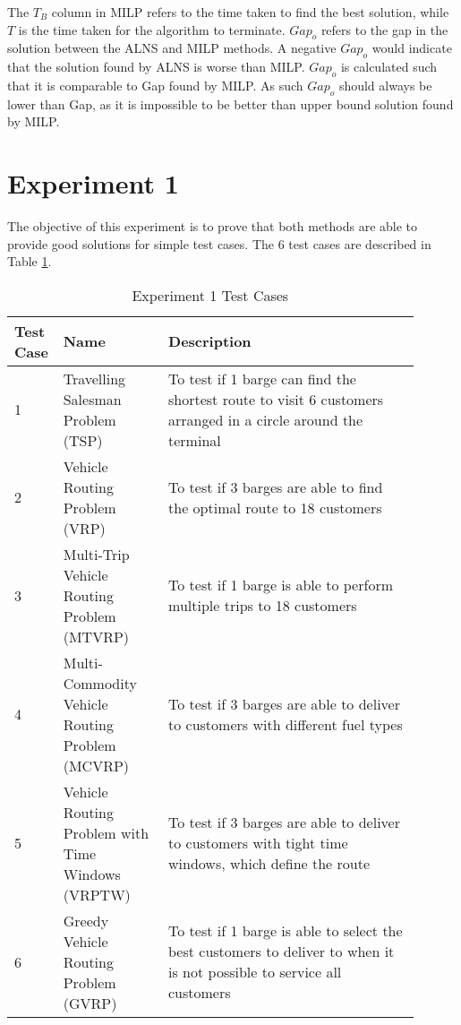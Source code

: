 The $T_{B}$ column in MILP refers to the time taken to find the best solution, while $T$ is the time taken for the algorithm to terminate. $Gap_{o}$ refers to the gap in the solution between the ALNS and MILP methods. A negative $Gap_{o}$ would indicate that the solution found by ALNS is worse than MILP. $Gap_{o}$ is calculated such that it is comparable to Gap found by MILP. As such $Gap_{o}$ should always be lower than Gap, as it is impossible to be better than upper bound solution found by MILP.

\section{Experiment 1}
The objective of this experiment is to prove that both methods are able to provide good solutions for simple test cases. The 6 test cases are described in Table \ref{tab:Expt_1}. 

\begin{table}[h]
    \centering
    \begin{tabular}{p{0.05\linewidth}>{\raggedright}p{0.25\linewidth} p{0.6\linewidth}}
        \toprule
        \textbf{Test Case}&\textbf{Name} & \textbf{Description} \\ 
        \midrule
    
	1& Travelling Salesman Problem (TSP) & To test if 1 barge can find the shortest route to visit 6 customers arranged in a circle around the terminal\\ \addlinespace
     
      2& Vehicle Routing Problem (VRP) & To test if 3 barges are able to find the optimal route to 18 customers\\\addlinespace
        
       3& Multi-Trip Vehicle Routing Problem (MTVRP) & To test if 1 barge is able to perform multiple trips to 18 customers \\ \addlinespace
        
        4& Multi-Commodity Vehicle Routing Problem (MCVRP)& To test if 3 barges are able to deliver to customers with different fuel types \\ \addlinespace
        
        5& Vehicle Routing Problem with Time Windows (VRPTW)& To test if 3 barges are able to deliver to customers with tight time windows, which define the route\\ \addlinespace
        
       6& Greedy Vehicle Routing Problem (GVRP)& To test if 1 barge is able to select the best customers to deliver to when it is not possible to service all customers\\ 
    \bottomrule
    \end{tabular}
    \caption{Experiment 1 Test Cases}
    \label{tab:Expt_1}
\end{table}

